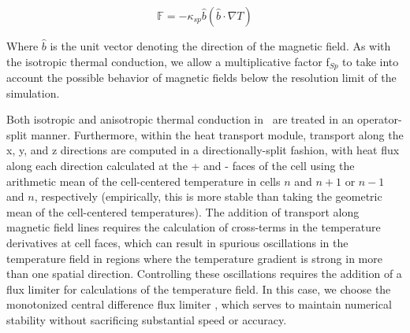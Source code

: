 \begin{equation}
\mathbb{F} = -\kappa_{sp} \hat{b} (\hat{b} \cdot \nabla T)
\end{equation}

Where $\hat{b}$ is the unit vector denoting the direction of the
magnetic field.  As with the isotropic thermal conduction, we allow a
multiplicative factor f$_{Sp}$ to take into account the possible
behavior of magnetic fields below the resolution limit of the
simulation.

Both isotropic and anisotropic thermal conduction in \enzo\ are treated
in an operator-split manner.  Furthermore, within the heat transport
module, transport along the x, y, and z directions are computed in a
directionally-split fashion, with heat flux along each direction
calculated at the + and - faces of the cell using the arithmetic mean
of the cell-centered temperature in cells $n$ and $n+1$ or $n-1$ and
$n$, respectively (empirically, this is more stable than taking the
geometric mean of the cell-centered temperatures).  The addition of
transport along magnetic field lines requires the calculation of
cross-terms in the temperature derivatives at cell faces, which can
result in spurious oscillations in the temperature field in regions
where the temperature gradient is strong in more than one spatial
direction.  Controlling these oscillations requires the addition of a
flux limiter for calculations of the temperature field.  In this case,
we choose the monotonized central difference flux limiter
\citep{1977JCoPh..23..263V}, which serves to maintain numerical
stability without sacrificing substantial speed or accuracy.
